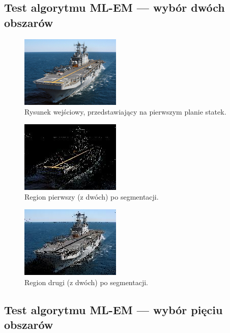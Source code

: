 \documentclass[10pt]{llncs}
\begin{document}
\FloatBarrier

\subsection{Test algorytmu ML-EM --- wybór dwóch obszarów}

\FloatBarrier

\begin{figure}[h!]
  \centering
  \includegraphics[scale=33.0, clip]{img/ship.jpg}
	\caption[]
  {Rysunek wejściowy, przedstawiający na pierwszym planie statek.}
\end{figure}

\FloatBarrier

\begin{figure}[h!]
  \centering
  \includegraphics[scale=.8, clip]{img/ship_k2_0.jpg}
	\caption[]
  {Region pierwszy (z dwóch) po segmentacji.}
\end{figure}

\FloatBarrier

\begin{figure}[h!]
  \centering
  \includegraphics[scale=.8, clip]{img/ship_k2_1.jpg}
	\caption[]
  {Region drugi (z dwóch) po segmentacji.}
\end{figure}

\FloatBarrier

\subsection{Test algorytmu ML-EM --- wybór pięciu obszarów}
\end{document}
